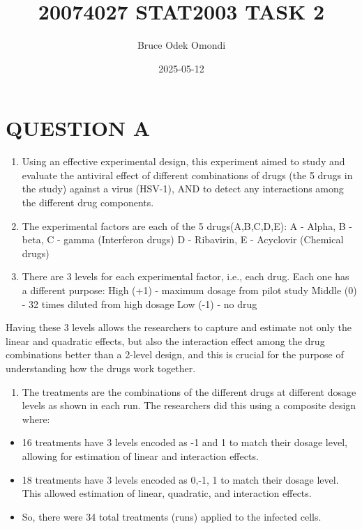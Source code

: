 \documentclass[
]{article}
\title{20074027 STAT2003 TASK 2}
\author{Bruce Odek Omondi}
\date{2025-05-12}
\providecommand{\tightlist}{%
  \setlength{\itemsep}{0pt}\setlength{\parskip}{0pt}}
\begin{document}
\maketitle

\hypertarget{question-a}{%
\section{QUESTION A}\label{question-a}}

\begin{enumerate}
\def\labelenumi{\roman{enumi}.}
\item
  Using an effective experimental design, this experiment aimed to study
  and evaluate the antiviral effect of different combinations of drugs
  (the 5 drugs in the study) against a virus (HSV-1), AND to detect any
  interactions among the different drug components.
\item
  The experimental factors are each of the 5 drugs(A,B,C,D,E): A -
  Alpha, B - beta, C - gamma (Interferon drugs) D - Ribavirin, E -
  Acyclovir (Chemical drugs)
\item
  There are 3 levels for each experimental factor, i.e., each drug. Each
  one has a different purpose: High (+1) - maximum dosage from pilot
  study Middle (0) - 32 times diluted from high dosage Low (-1) - no
  drug
\end{enumerate}

Having these 3 levels allows the researchers to capture and estimate not
only the linear and quadratic effects, but also the interaction effect
among the drug combinations better than a 2-level design, and this is
crucial for the purpose of understanding how the drugs work together.

\begin{enumerate}
\def\labelenumi{\roman{enumi}.}
\setcounter{enumi}{3}
\tightlist
\item
  The treatments are the combinations of the different drugs at
  different dosage levels as shown in each run. The researchers did this
  using a composite design where:
\end{enumerate}

\begin{itemize}
\tightlist
\item
  16 treatments have 3 levels encoded as -1 and 1 to match their dosage
  level, allowing for estimation of linear and interaction effects.
\item
  18 treatments have 3 levels encoded as 0,-1, 1 to match their dosage
  level. This allowed estimation of linear, quadratic, and interaction
  effects.
\item
  So, there were 34 total treatments (runs) applied to the infected
  cells.
\end{itemize}
\end{document}
